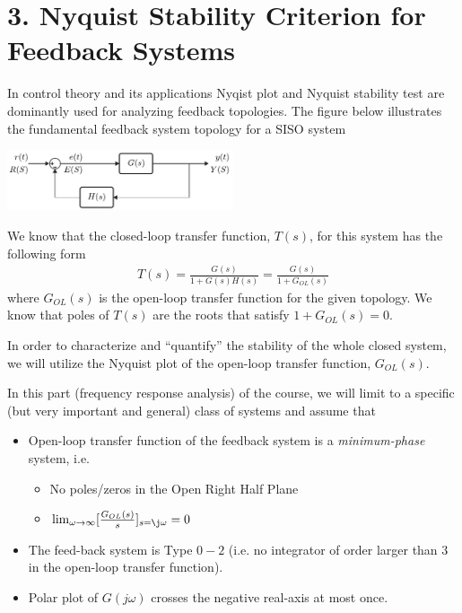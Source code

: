 \documentclass{article}
\begin{document}
\section*{3. Nyquist Stability Criterion for Feedback Systems}

In control theory and its applications Nyqist plot and Nyquist stability test are dominantly used for
analyzing feedback topologies. The figure below illustrates the fundamental feedback system topology for a SISO system

\vspace{6 pt}

  \begin{minipage}[h]{1\linewidth}
    \begin{center}
      \includegraphics[width=0.5\textwidth]{unityfeedback}
    \end{center}
  \end{minipage}

\vspace{6 pt}

We know that the closed-loop transfer function, $T(s)$, for this
system has the following form
%
\begin{align*}
  T(s) = \frac{G(s)}{1 + G(s) H(s)} = \frac{G(s)}{1 + G_{OL}(s)}  
\end{align*}
%
where $G_{OL}(s)$ is the open-loop transfer function for the given
topology. We know that poles of $T(s)$ are the roots that satisfy 
$1 + G_{OL}(s) = 0$. 

In order to characterize and ``quantify'' the stability of the whole
closed system, we will utilize the Nyquist plot of the open-loop 
transfer function, $G_{OL}(s)$. 

In this part (frequency response analysis) of the course, we will
limit to a specific (but very important and general) class of systems 
and assume that 
%
\begin{itemize}
  \item Open-loop transfer function of the feedback system is a
    \textit{minimum-phase} system, i.e.
    \begin{itemize}
      \item No poles/zeros in the Open Right Half Plane
      \item $\lim_{\omega \to \infty} [ \frac{G_{OL}(s)}{s} ]_{s = \j \omega} = 0 $
    \end{itemize}    
  \item The feed-back system is Type $0-2$ (i.e. no integrator of
    order larger than 3 in the open-loop transfer function). 
    \item Polar plot of $G(j \omega)$ crosses the negative real-axis
      at most once. 
\end{itemize}
%
\end{document}

